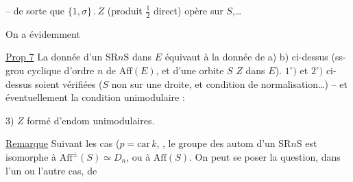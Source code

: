  -- de sorte que $\{1,\sigma\}\mathbin{.}Z$ (produit $\frac12$ direct) opère sur $S$,\ldots {}

On a évidemment

\uline{Prop 7} La donnée d'un  $\mathrm{SR}n\mathrm S$ dans $E$ équivaut à la donnée de a) b) ci-dessus (ss-grou  cyclique d'ordre $n$ de $\mathrm{Aff}(E)$, et d'une orbite $S$  $Z$ dans $E$).   $1^\circ)$ et $2^\circ)$ ci-dessus soient vérifiées ($S$ non sur une droite, et condition de normalisation\ldots) -- et éventuellement la condition unimodulaire :

3) $Z$ formé d'endom unimodulaires.

\uline{Remarque} Suivant les cas ($p=\mathrm{car}\, k$, , le groupe des autom d'un  $\mathrm{SR}n\mathrm S$ est isomorphe à $\mathrm{Aff}^{\pm}(S)\simeq D_n$, ou à $\mathrm{Aff}(S)$. On peut se poser la question, dans l'un ou l'autre cas, de 
